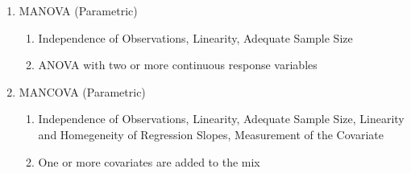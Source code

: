 \documentclass[6pt]{article}
\begin{document}
\begin{multicols*}{2}
\begin{enumerate}
        1. Understand the given data
    
        2. Compute the Overall Mean for Transmission Rate, 

        3. Compute the factor means,
    
        4. Compute for the adjusted means, if needed.

        5. Perform ANOVA on the adjusted means

        6. Conclude

        \item MANOVA (Parametric)
        \begin{enumerate}
            \item Independence of Observations, Linearity, Adequate Sample Size
            \item ANOVA with two or more continuous response variables
        \end{enumerate}
        \item MANCOVA (Parametric)
        \begin{enumerate}
            \item Independence of Observations, Linearity, Adequate Sample Size, Linearity and Homegeneity of Regression Slopes, Measurement of the Covariate
            \item One or more covariates are added to the mix
        \end{enumerate}
    \end{enumerate}
    \end{multicols*}
\end{document}
